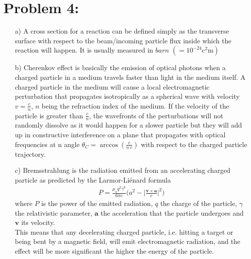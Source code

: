 \documentclass[10pt,a4paper]{article}
\begin{document}
\section*{Problem 4:}
\begin{enumerate}
\item[a)] A cross section for a reaction can be defined simply as the transverse surface with respect to the beam/incoming particle flux inside which the reaction will happen. It is usually measured in $\si{barn}$ $(=10^{-24}\si{\square\centi\meter})$ 

\item[b)] Cherenkov effect is basically the emission of optical photons when a charged particle in a medium travels faster than light in the medium itself. 
A charged particle in the medium will cause a local electromagnetic perturbation that propagates isotropically as a spherical wave with velocity $v=\frac{c}{n}$, $n$ being the refraction index of the medium. If the velocity of the particle is greater than $\frac{c}{n}$, the wavefronts of the perturbations will not randomly dissolve as it would happen for a slower particle but they will add up in constructive interference on a plane that propagates with optical frequencies at n angle $\theta_C = \arccos(\frac{c}{n\,v})$ with respect to the charged particle trajectory.

\item[c)] Bremsstrahlung is the radiation emitted from an accelerating charged particle as predicted by the Larmor-Liénard formula
\begin{align*}
P = \frac{\mu_o q^2 \gamma^6}{6\pi c}\bigg( a^2 - \bigg|\frac{ \mathbf{v}\times\mathbf{a}}{c} \bigg|^2 \bigg)
\end{align*} 
where $P$ is the power of the emitted radiation, $q$ the charge of the particle, $\gamma$ the relativistic parameter, $\mathbf{a}$ the acceleration that the particle undergoes and $\mathbf{v}$ its velocity.\\
This means that any decelerating charged particle, i.e. hitting a target or being bent by a magnetic field, will emit electromagnetic radiation, and the effect will be more significant the higher the energy of the particle.
\end{enumerate}
\end{document}
